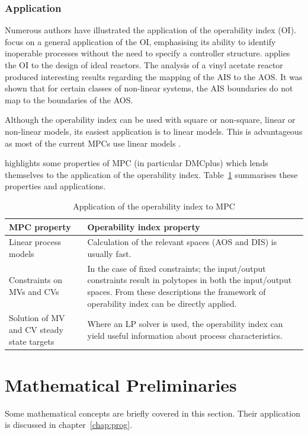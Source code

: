 \subsubsection{Application}
Numerous authors have illustrated the application of the operability index (OI). 
\citet{opconproc} focus on a general application of the OI, emphasising its ability to identify inoperable processes without the need to specify a controller structure. 
\citet{opidealrx} applies the OI to the design of ideal reactors. 
The analysis of a vinyl acetate reactor produced interesting results
regarding the mapping of the AIS to the AOS. 
It was shown that for certain classes of non-linear systems, the AIS boundaries do not map to the boundaries of the AOS.

Although the  operability index can be used with square or non-square, linear or non-linear models, its easiest application is to linear models. 
This is advantageous as most of the current MPCs use linear models \citep{vinsonphd}.

\citet{vinsonphd} highlights some properties of MPC (in particular DMCplus) which lends themselves to the  application of the operability index.
Table~\ref{tab:mpcoi} summarises these properties and applications.
\begin{table}[htbp]
  \centering
  \caption[Application of the operability index to MPC]{Application of the
    operability index to MPC \citep{vinsonphd}}
  \label{tab:mpcoi}
    \begin{tabular}{p{6cm} p{9cm}}
      \toprule
      MPC property & Operability index property \\
      \midrule
      Linear process models & Calculation of the relevant spaces (AOS and DIS) is usually fast.\\[1.3ex]
      Constraints on MVs and CVs & In the case of fixed constraints; the input/output constraints result in polytopes in both the input/output spaces. 
From these descriptions the framework of operability index can be directly applied.\\[1.3ex]
      Solution of MV and CV steady state targets  & Where an LP solver is used, the operability index can yield useful information about process characteristics.\\
      \bottomrule
    \end{tabular}
\end{table}

\section{Mathematical Preliminaries}
Some mathematical concepts are briefly covered in this section.
Their application is discussed in chapter~\ref{chap:prog}.
